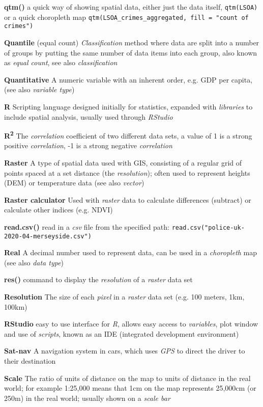 \documentclass[a4paper,10pt]{article}
\begin{document}
\begin{multicols}{2}
\textbf{qtm()} a quick way of showing spatial data, either just the data itself, \texttt{qtm(LSOA)} or a quick choropleth map \texttt{qtm(LSOA\_crimes\_aggregated, fill = "count of crimes")}

\textbf{Quantile} (equal count) \textit{Classification} method where data are split into a number of groups by putting the same number of data items into each group, also known as \textit{equal count}, see also \textit{classification}

\textbf{Quantitative} A numeric variable with an inherent order, e.g. GDP per capita, (see also \textit{variable type})

\textbf{R} Scripting language designed initially for statistics, expanded with \textit{libraries} to include spatial analysis, usually used through  \textit{RStudio}

\textbf{R\textsuperscript{2}} The \textit{correlation} coefficient of two different data sets, a value of 1 is a strong positive \textit{correlation}, -1 is a strong negative \textit{correlation}

\textbf{Raster} A type of spatial data used with GIS, consisting of a regular grid of points spaced at a set distance (the \textit{resolution}); often used to represent heights (DEM) or temperature data (see also \textit{vector})

\textbf{Raster calculator} Used with \textit{raster} data to calculate differences (subtract) or calculate other indices (e.g. NDVI)

\textbf{read.csv()} read in a \textit{csv} file from the specified path: \texttt{read.csv("police-uk-2020-04-merseyside.csv")}

\textbf{Real} A decimal number used to represent data, can be used in a \textit{choropleth} map (see also \textit{data type}) 

\textbf{res()} command to display the \textit{resolution} of a \textit{raster} data set

\textbf{Resolution} The size of each \textit{pixel} in a \textit{raster} data set (e.g. 100 meters, 1km, 100km)

\textbf{RStudio} easy to use interface for \textit{R}, allows easy access to \textit{variables}, plot window and use of \textit{scripts}, known as an IDE (integrated development environment)

\textbf{Sat-nav} A navigation system in cars, which uses \textit{GPS} to direct the driver to their destination

\textbf{Scale} The ratio of units of distance on the map to units of distance in the real world; for example 1:25,000 means that 1cm on the map represents 25,000cm (or 250m) in the real world; usually shown on a \textit{scale bar}


\end{multicols}
\end{document}
